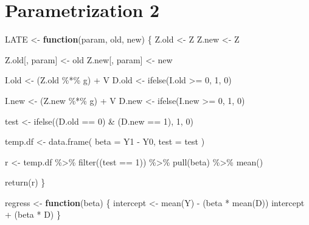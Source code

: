\documentclass[9pt,twocolumn,twoside,]{pnas-new}
\newenvironment{Shaded}{}{}
\newcommand{\ControlFlowTok}[1]{\textcolor[rgb]{0.00,0.44,0.13}{\textbf{#1}}}
\newcommand{\DecValTok}[1]{\textcolor[rgb]{0.25,0.63,0.44}{#1}}
\newcommand{\FunctionTok}[1]{\textcolor[rgb]{0.02,0.16,0.49}{#1}}
\newcommand{\NormalTok}[1]{#1}
\newcommand{\OtherTok}[1]{\textcolor[rgb]{0.00,0.44,0.13}{#1}}
\newcommand{\SpecialCharTok}[1]{\textcolor[rgb]{0.25,0.44,0.63}{#1}}
\newcommand{\StringTok}[1]{\textcolor[rgb]{0.25,0.44,0.63}{#1}}
\begin{document}
\hypertarget{parametrization-2}{%
\section{Parametrization 2}\label{parametrization-2}}

\begin{Shaded}
\begin{Highlighting}[]
\NormalTok{LATE }\OtherTok{\textless{}{-}} \ControlFlowTok{function}\NormalTok{(param, old, new) \{}
\NormalTok{    Z.old }\OtherTok{\textless{}{-}}\NormalTok{ Z}
\NormalTok{    Z.new }\OtherTok{\textless{}{-}}\NormalTok{ Z}
    
\NormalTok{    Z.old[, param] }\OtherTok{\textless{}{-}}\NormalTok{ old}
\NormalTok{    Z.new[, param] }\OtherTok{\textless{}{-}}\NormalTok{ new}
    
\NormalTok{    I.old }\OtherTok{\textless{}{-}}\NormalTok{ (Z.old }\SpecialCharTok{\%*\%}\NormalTok{ g) }\SpecialCharTok{+}\NormalTok{ V}
\NormalTok{    D.old }\OtherTok{\textless{}{-}} \FunctionTok{ifelse}\NormalTok{(I.old }\SpecialCharTok{\textgreater{}=} \DecValTok{0}\NormalTok{, }\DecValTok{1}\NormalTok{, }\DecValTok{0}\NormalTok{)}
    
\NormalTok{    I.new }\OtherTok{\textless{}{-}}\NormalTok{ (Z.new }\SpecialCharTok{\%*\%}\NormalTok{ g) }\SpecialCharTok{+}\NormalTok{ V}
\NormalTok{    D.new }\OtherTok{\textless{}{-}} \FunctionTok{ifelse}\NormalTok{(I.new }\SpecialCharTok{\textgreater{}=} \DecValTok{0}\NormalTok{, }\DecValTok{1}\NormalTok{, }\DecValTok{0}\NormalTok{)}
    
\NormalTok{    test }\OtherTok{\textless{}{-}} \FunctionTok{ifelse}\NormalTok{((D.old }\SpecialCharTok{==} \DecValTok{0}\NormalTok{) }\SpecialCharTok{\&}\NormalTok{ (D.new }\SpecialCharTok{==} \DecValTok{1}\NormalTok{), }\DecValTok{1}\NormalTok{, }\DecValTok{0}\NormalTok{)}
    
\NormalTok{    temp.df }\OtherTok{\textless{}{-}} \FunctionTok{data.frame}\NormalTok{(}
        \StringTok{\textquotesingle{}beta\textquotesingle{}} \OtherTok{=}\NormalTok{ Y1 }\SpecialCharTok{{-}}\NormalTok{ Y0,}
        \StringTok{\textquotesingle{}test\textquotesingle{}} \OtherTok{=}\NormalTok{ test}
\NormalTok{    )}
    
\NormalTok{    r }\OtherTok{\textless{}{-}}\NormalTok{ temp.df }\SpecialCharTok{\%\textgreater{}\%}
        \FunctionTok{filter}\NormalTok{((test }\SpecialCharTok{==} \DecValTok{1}\NormalTok{)) }\SpecialCharTok{\%\textgreater{}\%}
        \FunctionTok{pull}\NormalTok{(beta) }\SpecialCharTok{\%\textgreater{}\%}
        \FunctionTok{mean}\NormalTok{()}
    
    \FunctionTok{return}\NormalTok{(r)}
\NormalTok{\}}

\NormalTok{regress }\OtherTok{\textless{}{-}} \ControlFlowTok{function}\NormalTok{(beta) \{}
\NormalTok{    intercept }\OtherTok{\textless{}{-}} \FunctionTok{mean}\NormalTok{(Y) }\SpecialCharTok{{-}}\NormalTok{ (beta }\SpecialCharTok{*} \FunctionTok{mean}\NormalTok{(D))}
\NormalTok{    intercept }\SpecialCharTok{+}\NormalTok{ (beta }\SpecialCharTok{*}\NormalTok{ D)}
\NormalTok{\}}
\end{Highlighting}
\end{Shaded}
\end{document}

